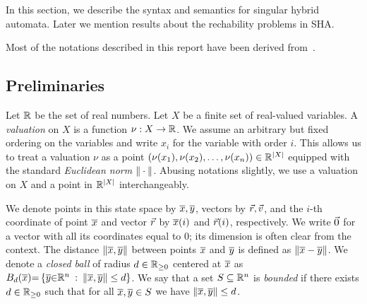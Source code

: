  
 In this section, we describe the syntax and semantics for singular hybrid automata.
 Later we mention results about the rechability problems in SHA.
 
 Most of the notations described in this report have been derived from~\cite{SMT14}. 
 
 \subsection{Preliminaries}
 
  Let $\mathbb R$ be the set of real numbers.
 Let $X$ be a finite set of real-valued variables.
 A \emph{valuation} on $X$ is a function $\nu : X \to \mathbb R$.
 We assume an arbitrary but fixed ordering on the variables and write $x_i$
 for the variable with order $i$. 
 This allows us to treat a valuation $\nu$ as a point $(\nu(x_1), \nu(x_2),
 \ldots, \nu(x_n)) \in \mathbb R^{|X|}$ 
 equipped  with the standard \emph{Euclidean norm} $\|\cdot\|$. 
 Abusing notations slightly, we use a valuation on $X$ and a point in
 $\mathbb R^{|X|}$ interchangeably. 
 
 We denote points in this state space by ${\overline{x}}, {\overline{y}}$,  vectors by $\vec{r}, \vec{v}$, and 
 the $i$-th coordinate of point ${\overline{x}}$ and vector $\vec{r}$ by ${\overline{x}}(i)$ and $\vec{r}(i)$,
 respectively. 
 We write $\vec{0}$ for a vector with all its coordinates equal to $0$; 
 its dimension is often clear from the context.
 The distance $\|{\overline{x}}, {\overline{y}}\|$ between points ${\overline{x}}$ and ${\overline{y}}$ is defined as
 $\|{\overline{x}} - {\overline{y}}\|$. 
 We denote a {\em closed ball} of radius $d \in \mathbb R_{\geq 0}$ centered at ${\overline{x}}$ as
 $B_{d}({\overline{x}}) {=} \left\{ {\overline{y}} {\in} \mathbb R^n \::\: \|{\overline{x}},{\overline{y}}\| \leq d \right\}$.
 We say that a set $S \subseteq \mathbb R^n$ is {\em bounded} if there exists
 $d \in \mathbb R_{\geq 0}$ such that for all ${\overline{x}}, {\overline{y}} \in S$ we have
 $\|{\overline{x}},{\overline{y}}\| \leq d$.
 
